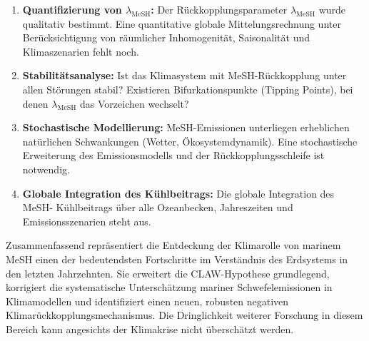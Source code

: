 ﻿\documentclass[a4paper,12pt]{article}
\theoremstyle{definition}
\begin{document}
\begin{enumerate}
  \item \textbf{Quantifizierung von $\lambda_{\mathrm{MeSH}}$:} Der Rückkopplungsparameter
        $\lambda_{\mathrm{MeSH}}$ wurde qualitativ bestimmt. Eine quantitative globale
        Mittelungsrechnung unter Berücksichtigung von räumlicher Inhomogenität,
        Saisonalität und Klimaszenarien fehlt noch.
  \item \textbf{Stabilitätsanalyse:} Ist das Klimasystem mit MeSH-Rückkopplung unter allen
        Störungen stabil? Existieren Bifurkationspunkte (Tipping Points), bei denen
        $\lambda_{\mathrm{MeSH}}$ das Vorzeichen wechselt?
  \item \textbf{Stochastische Modellierung:} MeSH-Emissionen unterliegen erheblichen natürlichen
        Schwankungen (Wetter, Ökosystemdynamik). Eine stochastische Erweiterung des
        Emissionsmodells und der Rückkopplungsschleife ist notwendig.
  \item \textbf{Globale Integration des Kühlbeitrags:} Die globale Integration des MeSH-
        Kühlbeitrags über alle Ozeanbecken, Jahreszeiten und Emissionsszenarien steht aus.
\end{enumerate}

Zusammenfassend repräsentiert die Entdeckung der Klimarolle von marinem MeSH einen der
bedeutendsten Fortschritte im Verständnis des Erdsystems in den letzten Jahrzehnten. Sie
erweitert die CLAW-Hypothese \cite{charlson1987} grundlegend, korrigiert die systematische
Unterschätzung mariner Schwefelemissionen in Klimamodellen und identifiziert einen neuen,
robusten negativen Klimarückkopplungsmechanismus. Die Dringlichkeit weiterer Forschung in
diesem Bereich kann angesichts der Klimakrise nicht überschätzt werden.
\end{document}
